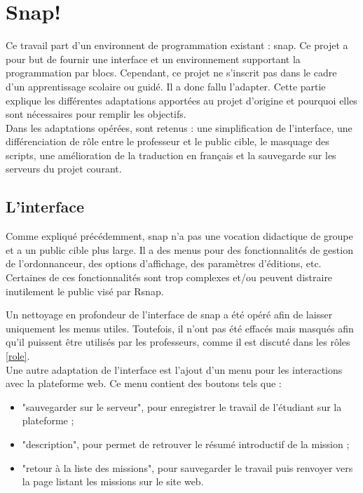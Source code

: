 \section{Snap!}
\label{solution SNAP}
Ce travail part d'un environnent de programmation existant : \gls{snap}. Ce projet a pour but de fournir une interface et un environnement supportant la programmation par \glspl{bloc}. Cependant, ce projet ne s'inscrit pas dans le cadre d'un apprentissage scolaire ou guidé. Il a donc fallu l'adapter. Cette partie explique les différentes adaptations apportées au projet d'origine et pourquoi elles sont nécessaires pour remplir les objectifs.\\

Dans les adaptations opérées, sont retenus : une simplification de l'interface, une différenciation de rôle entre le professeur et le public cible, le masquage des scripts, une amélioration de la traduction en français et la sauvegarde sur les serveurs du projet courant.

\subsection{L'interface}
\label{interface}
Comme expliqué précédemment, \gls{snap} n'a pas une vocation didactique de groupe et a un public cible plus large. Il a des menus pour des fonctionnalités de gestion de l'ordonnanceur, des options d'affichage, des paramètres d'éditions, etc. Certaines de ces fonctionnalités sont trop complexes et/ou peuvent distraire inutilement le public visé par \gls{Rsnap}.

Un nettoyage en profondeur de l'interface de \gls{snap} a été opéré afin de laisser uniquement les menus utiles. Toutefois, il n'ont pas été effacés mais masqués afin qu'il puissent être utilisés par les professeurs, comme il est discuté dans les rôles \ref{role}.\\

Une autre adaptation de l'interface est l'ajout d'un menu pour les interactions avec la plateforme web. Ce menu contient des boutons tels que :
\begin{itemize}
  \item "sauvegarder sur le serveur", pour enregistrer le travail de l'étudiant sur la plateforme ;
  \item "description", pour permet de retrouver le résumé introductif de la mission ;
  \item "retour à la liste des missions", pour sauvegarder le travail puis renvoyer vers la page listant les missions sur le site web.
\end{itemize}

